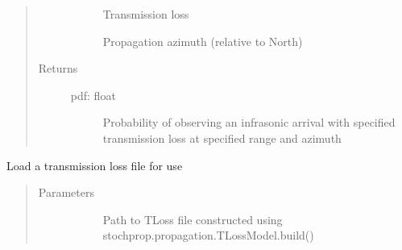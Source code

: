 \documentclass[letterpaper,10pt,english]{sphinxmanual}
\begin{document}
\begin{fulllineitems}
\begin{fulllineitems}
\begin{quote}
\begin{description}
\begin{description}
\item[{}] \leavevmode
\sphinxAtStartPar
Transmission loss

\item[{}] \leavevmode
\sphinxAtStartPar
Propagation azimuth (relative to North)

\end{description}

\item[{Returns}] \leavevmode\begin{description}
\item[{pdf: float}] \leavevmode
\sphinxAtStartPar
Probability of observing an infrasonic arrival with specified transmission loss at specified range and azimuth

\end{description}

\end{description}\end{quote}

\end{fulllineitems}


\begin{fulllineitems}
\label{\detokenize{stochprop.propagation:stochprop.propagation.TLossModel.load}}
\sphinxAtStartPar
Load a transmission loss file for use
\begin{quote}\begin{description}
\item[{Parameters}] \leavevmode\begin{description}
\item[{}] \leavevmode
\sphinxAtStartPar
Path to TLoss file constructed using stochprop.propagation.TLossModel.build()

\end{description}

\end{description}\end{quote}

\end{fulllineitems}


\end{fulllineitems}

\end{document}
